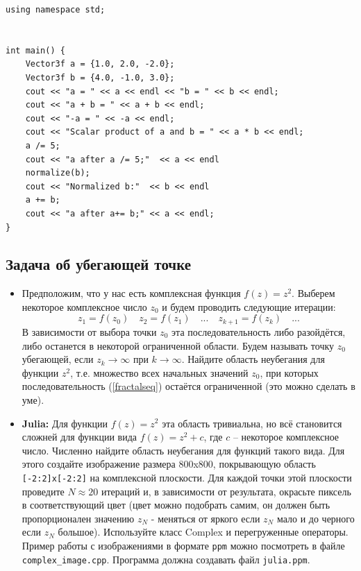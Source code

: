 \documentclass{article}
\begin{document}
\begin{itemize}
\begin{lstlisting}
using namespace std;


int main() {
	Vector3f a = {1.0, 2.0, -2.0};
	Vector3f b = {4.0, -1.0, 3.0};
	cout << "a = " << a << endl << "b = " << b << endl;
	cout << "a + b = " << a + b << endl;
	cout << "-a = " << -a << endl;
	cout << "Scalar product of a and b = " << a * b << endl;
	a /= 5;
	cout << "a after a /= 5;"  << a << endl
	normalize(b);
	cout << "Normalized b:"  << b << endl
	a += b;
	cout << "a after a+= b;" << a << endl;
}
\end{lstlisting}

\end{itemize}
\subsection*{Задача об убегающей точке}
\begin{itemize}
\item Предположим, что у нас есть комплексная функция $f(z) = z^2$. Выберем некоторое комплексное число $z_0$ и будем проводить следующие итерации: 
\begin{equation}
\label{fractalseq}
z_1 = f(z_0)\quad z_2 = f(z_1)\quad ...\quad z_{k+1} = f(z_k)\quad ...
\end{equation}
В зависимости от выбора точки $z_0$ эта последовательность либо разойдётся, либо останется в некоторой ограниченной области. Будем называть точку $z_0$ убегающей, если $z_k \rightarrow \infty$ при $k \rightarrow \infty$. Найдите область неубегания для функции $z^2$, т.е. множество всех начальных значений $z_0$, при которых последовательность (\ref{fractalseq}) остаётся ограниченной (это можно сделать в уме). \\

\item \textbf{Julia:} Для функции $f(z) = z^2$ эта область тривиальна, но всё становится сложней для функции вида $f(z) = z^2 + c$, где $c$ -- некоторое комплексное число. Численно найдите область неубегания для функций такого вида. Для этого создайте изображение размера 800x800, покрывающую область \texttt{[-2:2]x[-2:2]} на комплексной плоскости. Для каждой точки этой плоскости проведите $N \approx 20$ итераций и, в зависимости от результата, окрасьте пиксель в соответствующий цвет (цвет можно подобрать самим, он должен быть пропорционален значению $z_N$ - меняться от яркого если $z_N$ мало и до черного если $z_N$ большое). Используйте класс Complex и перегруженные операторы. Пример работы с изображениями в формате \texttt{ppm} можно посмотреть в файле \texttt{complex\_image.cpp}. Программа должна создавать файл \texttt{julia.ppm}.


\end{itemize}
\end{document}
